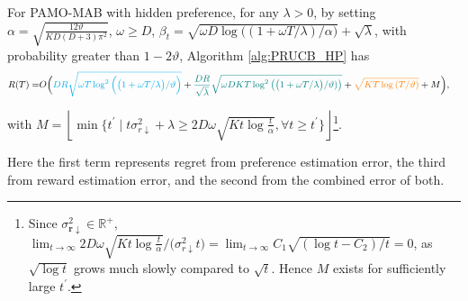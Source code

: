 \begin{theorem}
\label{theorem:up_bd_hiden}
For PAMO-MAB with hidden preference, for any $\lambda > 0$, by setting
$\alpha = \sqrt{\frac{12 \vartheta}{KD(D+3) \pi^2}}$,
$\omega \geq D$,
$\beta_t = \sqrt{\omega D \log\big((1 + \omega T/\lambda)/\alpha\big)} + \sqrt{\lambda}$, 
with probability greater than $1- 2\vartheta$, Algorithm \ref{alg:PRUCB_HP} has
\[
\small
\begin{aligned}
\textstyle
R(T) 
=
& O\Big(
\textcolor{cyan}{
DR \sqrt{ \omega T \log^{2} \Big( \big(1 + \omega T/\lambda\big)/\vartheta \Big)}
}
+ 
\textcolor{teal}{
\frac{DR}{\sqrt{\lambda}} \sqrt{ \omega DK T \log^2 \left(\big( 1 + \omega T/\lambda \big)/\vartheta) \right)}
}
+ 
\textcolor{orange}{
\sqrt{ KT \log \left( T/\vartheta \right)}
}
+
M
\Big),
\end{aligned}
\]
\begin{small}
with $M = \left\lfloor \min \big \{ t^{\prime} \mid t  \sigma^2_{r \downarrow} + \lambda \geq 2D \omega \sqrt{Kt\log \frac{t}{\alpha} }, \forall t \geq t^{\prime} \big \} \right \rfloor$\footnote{Since $\sigma^2_{\boldsymbol{r} \downarrow} \!\in\! \mathbb{R}^{+}$, 
$\lim_{t \rightarrow \infty} 2D \omega \sqrt{Kt \log \frac{t}{\alpha} }/\big(\sigma^2_{r \downarrow}t\big) = \lim_{t \rightarrow \infty} C_1 \sqrt{ (\log t - C_2)/t} = 0$, as $\sqrt{\log t}$ grows much slowly compared to $\sqrt{t}$. Hence $M$ exists for sufficiently large $t^{\prime}$.}.
\end{small}
Here the first term represents regret from preference estimation error, the third from reward estimation error, and the second from the combined error of both.
\end{theorem} 

